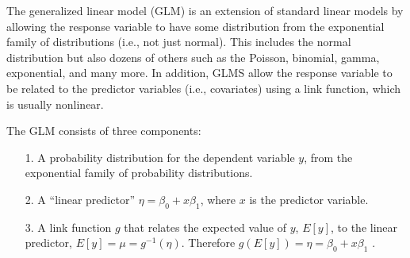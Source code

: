 The generalized linear model (GLM) is an extension of standard linear
models by allowing the response
variable to have some distribution from the exponential family of
distributions (i.e., not just normal). This includes the normal
distribution but also dozens of others such as the Poisson, binomial,
gamma, exponential, and many more. In addition, GLMS allow the
response variable to be related to the predictor variables (i.e.,
covariates) using a link function, which is usually nonlinear.  

The GLM consists of three components:
\begin{itemize}
\item[1.] A probability distribution for the dependent variable $y$,
from the exponential family of probability distributions.
\item[2.] A ``linear predictor'' $\eta = \beta_0 + x \beta_1$, where $x$ is the predictor variable.
\item[3.] A link function $g$ that relates the expected value of $y$, $E[y]$, to the linear predictor, $E[y] = \mu = g^{-1}(\eta)$. Therefore $g(E[y]) = \eta = \beta_0 + x \beta_1$ .
\end{itemize}


